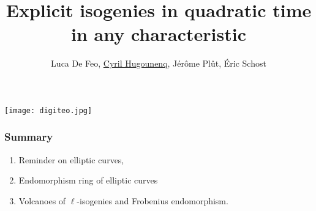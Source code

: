 \documentclass[10pt,a4paper]{beamer}
\theoremstyle{plain}
\theoremstyle{definition}
\theoremstyle{definition}
\theoremstyle{definition}
\theoremstyle{definition}
\newtheorem{defi}[thm]{Definition}
\theoremstyle{remark}
\theoremstyle{remark}
\begin{document}
\author{
 Luca De Feo, \underline{Cyril Hugounenq}, J\'er\^ome Pl\^ut, \'Eric Schost
}
\title[Explicit isogenies in quadratic time in any characteristic]{
Explicit isogenies in quadratic time in any characteristic}
\begin{frame}
\titlepage
\texttt{[image: digiteo.jpg]} 
\end{frame}
\begin{frame}
\frametitle{Summary}
\begin{enumerate}
\item Reminder on elliptic curves,
\item Endomorphism ring  of elliptic curves %
\item Volcanoes of $\ell$-isogenies and Frobenius endomorphism.
\end{enumerate}
\end{frame}

% 
%
\end{document}
